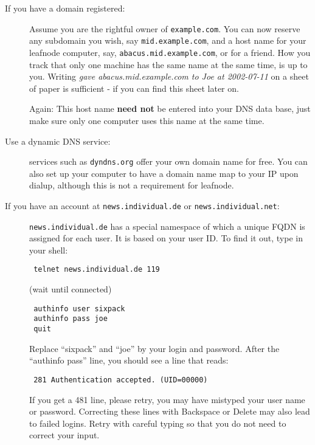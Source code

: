 \documentclass[10pt,english,a5paper]{article}
\begin{document}
\begin{description}

\item[If you have a domain registered:]

Assume you are the rightful owner of \verb+example.com+. You can now reserve
any subdomain you wish, say \verb+mid.example.com+, and a host name for your
leafnode computer, say, \verb+abacus.mid.example.com+, or for a friend. How you
track that only one machine has the same name at the same time, is up to
you. Writing \textit{gave abacus.mid.example.com to Joe at 2002-07-11}
on a sheet of paper is sufficient - if you can find this sheet later on.

Again: This host name \textbf{need not} be entered into your DNS data base,
just make sure only one computer uses this name at the same time.

    \item[Use a dynamic DNS service:] services such as \verb+dyndns.org+
	offer your own domain name for free. You can also set up your
	computer to have a domain name map to your IP upon dialup,
	although this is not a requirement for leafnode.

\item[If you have an account at \texttt{news.individual.de} or
    \texttt{news.individual.net}:]

\verb+news.individual.de+ has a special namespace of which a unique FQDN
is assigned for each user. It is based on your user ID\@. To find it out, type in your shell:

\begin{verbatim}
 telnet news.individual.de 119
\end{verbatim}

 (wait until connected)

\begin{verbatim}
 authinfo user sixpack
 authinfo pass joe
 quit
\end{verbatim}

Replace ``sixpack'' and ``joe'' by your login and password. After the
``authinfo pass'' line, you should see a line that reads:

\begin{verbatim}
 281 Authentication accepted. (UID=00000)
\end{verbatim}

If you get a 481 line, please retry, you may have mistyped your user
name or password. Correcting these lines with Backspace or Delete may
also lead to failed logins. Retry with careful typing so that you do not
need to correct your input.


\end{description}
\end{document}
